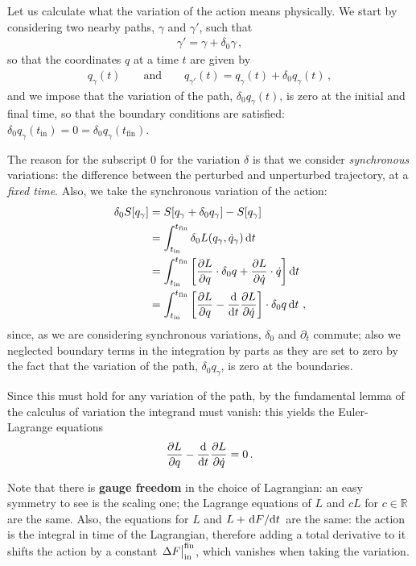 \documentclass[main.tex]{subfiles}
\begin{document}
Let us calculate what the variation of the action means physically. We start by considering two nearby paths, \(\gamma \) and \(\gamma '\), such that 
%
\begin{align}
\gamma ' = \gamma + \delta_0 \gamma 
\,,
\end{align}
%
so that the coordinates \(q\) at a time \(t\) are given by 
%
\begin{align}
q_{\gamma } (t) 
\qquad \text{and} \qquad
q_{\gamma '} (t) = q_{\gamma }(t) + \delta_0 q_{\gamma }(t)
\,,
\end{align}
%
and we impose that the variation of the path, \(\delta_0 q_{\gamma } (t)\), is zero at the initial and final time, so that the boundary conditions are satisfied: \(\delta_0 q_{\gamma }(t _{\text{in}}) = 0 = \delta_0 q_{\gamma }(t _{\text{fin}})\).

The reason for the subscript \(0\) for the variation \(\delta \) is that we consider \emph{synchronous} variations: the difference between the perturbed and unperturbed trajectory, at a \emph{fixed time}. 
Also, we take the synchronous variation of the action:
%
\begin{align}
\delta_0 S [q_{\gamma }] &= S [q_{\gamma } + \delta_0 q_{\gamma }] - S[q_{\gamma }]  \\
&= \int_{t _{\text{in}}}^{t _{\text{fin}}} \delta_0 L (q_{\gamma }, \dot{q}_{\gamma }) \dd{t}  \\
&= \int_{t _{\text{in}}}^{t _{\text{fin}}} \qty[ \pdv{L}{q} \cdot \delta_0 q + \pdv{L}{\dot{q}} \cdot \dot{q}] \dd{t}  \\
&= \int_{t _{\text{in}}}^{t _{\text{fin}}} \qty[\pdv{L}{q}  - \dv{}{t} \pdv{L}{\dot{q}}] \cdot \delta_0 q \dd{t}
\,,
\end{align}
%
since, as we are considering synchronous variations, \(\delta_0 \) and \(\partial_{t}\) commute; also we neglected boundary terms in the integration by parts as they are set to zero by the fact that the variation of the path,  \(\delta_0 q_{\gamma }\), is zero at the boundaries.

Since this must hold for any variation of the path, by the fundamental lemma of the calculus of variation the integrand must vanish: this yields the Euler-Lagrange equations 
%
\begin{align}
\pdv{L}{q} - \dv[]{}{t} \pdv{L}{\dot{q}} = 0
\,.
\end{align}

Note that there is \textbf{gauge freedom} in the choice of Lagrangian: an easy symmetry to see is the scaling one; the Lagrange equations of \(L\) and \(cL\) for \(c \in \mathbb{R}\) are the same. 
Also, the equations for \(L\) and \(L + \dv*{F}{t}\) are the same: the action is the integral in time of the Lagrangian, therefore adding a total derivative to it shifts the action by a constant \(\eval{\Delta F}_{\text{in}}^{\text{fin}}\), which vanishes when taking the variation.
\end{document}
